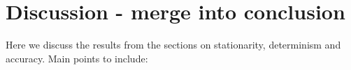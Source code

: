 

\section{Discussion - merge into conclusion}
\label{sec:stationarity_discussion}

Here we discuss the results from the sections on stationarity, determinism and accuracy. Main points to include:

